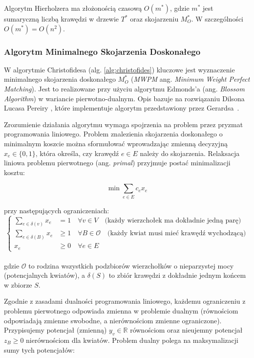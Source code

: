 \documentclass{article}
\theoremstyle{definition}
\theoremstyle{plain}
\theoremstyle{remark}
\begin{document}
Algorytm Hierholzera ma złożonością czasową $O(m^*)$, gdzie $m^*$ jest sumaryczną liczbą krawędzi w drzewie $T^*$ oraz skojarzeniu $M_O^*$. W szczególności $O(m^*) = O(n^2)$. 

\subsubsection{Algorytm Minimalnego Skojarzenia Doskonałego} 
W algorytmie Christofidesa (alg. \ref{alg:christofides}) kluczowe jest wyznaczenie minimalnego skojarzenia doskonałego $M_O^*$ (\textit{MWPM} ang. \textit{Minimum Weight Perfect Matching}). Jest to realizowane przy użyciu algorytmu Edmonds'a (ang. \textit{Blossom Algorithm}) w wariancie pierwotno-dualnym. Opis bazuje na rozwiązaniu Dilsona Lucasa Pereiry \cite{Pereira2011Matching}, które implementuje algorytm przedstawiony przez Gerardsa~\cite{GERARDS1995135}.

Zrozumienie działania algorytmu wymaga spojrzenia na problem przez pryzmat programowania liniowego. Problem znalezienia skojarzenia doskonałego o minimalnym koszcie można sformułować wprowadzając zmienną decyzyjną $x_e \in \{0, 1\}$, która określa, czy krawędź $e \in E$ należy do skojarzenia. Relaksacja liniowa problemu pierwotnego (ang. \textit{primal}) przyjmuje postać minimalizacji kosztu:

\begin{equation}
    \min \sum_{e \in E} c_e x_e
\end{equation}

\noindent
przy następujących ograniczeniach: \\

$$
\begin{cases}
    \sum_{e \in \delta(v)} x_e &= 1 \quad \forall v \in V \quad \text{(każdy wierzchołek ma dokładnie jedną parę)} \\
    \sum_{e \in \delta(B)} x_e &\ge 1 \quad \forall B \in \mathcal{O} \quad \text{(każdy kwiat musi mieć krawędź wychodzącą)} \\
    x_e &\ge 0 \quad \forall e \in E
\end{cases}
$$ \\

\noindent
gdzie $\mathcal{O}$ to rodzina wszystkich podzbiorów wierzchołków o nieparzystej mocy 
(potencjalnych kwiatów), a $\delta(S)$ to zbiór krawędzi z dokładnie jednym końcem 
w zbiorze $S$.

Zgodnie z zasadami dualności programowania liniowego, każdemu ograniczeniu z problemu pierwotnego odpowiada zmienna w problemie dualnym (równościom odpowiadają zmienne swobodne, a nierównościom zmienne ograniczone). Przypisujemy potencjał (zmienną) $y_v \in \mathbb{R}$ równościom oraz nieujemny potencjał $z_B \ge 0$ nierównościom dla kwiatów. Problem dualny polega na maksymalizacji sumy tych potencjałów:
\end{document}
